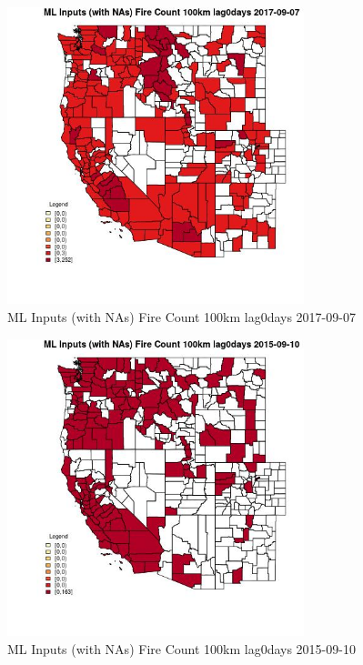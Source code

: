 \begin{figure} 
\centering  
\includegraphics[width=0.77\textwidth]{Code_Outputs/Report_ML_input_PM25_Step4_part_e_de_duplicated_aves_compiled_2019-05-20wNAs_CountyFire_Count_100km_lag0daysMean2017-09-07.jpg} 
\caption{\label{fig:Report_ML_input_PM25_Step4_part_e_de_duplicated_aves_compiled_2019-05-20wNAsCountyFire_Count_100km_lag0daysMean2017-09-07}ML Inputs (with NAs) Fire Count 100km lag0days 2017-09-07} 
\end{figure} 
 

\begin{figure} 
\centering  
\includegraphics[width=0.77\textwidth]{Code_Outputs/Report_ML_input_PM25_Step4_part_e_de_duplicated_aves_compiled_2019-05-20wNAs_CountyFire_Count_100km_lag0daysMean2015-09-10.jpg} 
\caption{\label{fig:Report_ML_input_PM25_Step4_part_e_de_duplicated_aves_compiled_2019-05-20wNAsCountyFire_Count_100km_lag0daysMean2015-09-10}ML Inputs (with NAs) Fire Count 100km lag0days 2015-09-10} 
\end{figure} 
 

